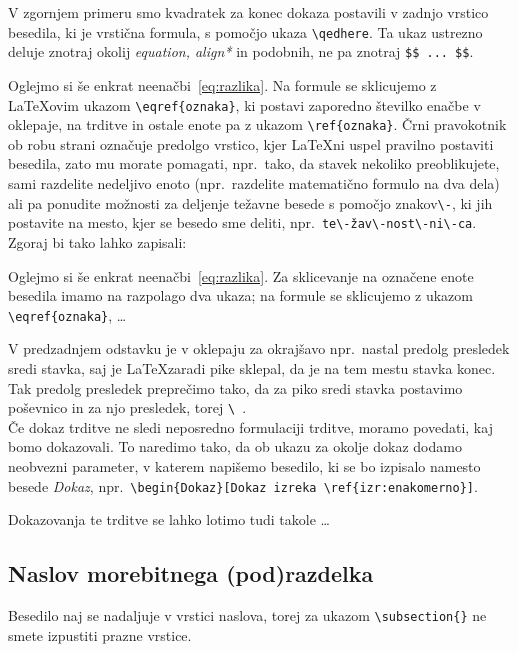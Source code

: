 \documentclass[mat1]{fmfdelo}
\begin{document}
V zgornjem primeru smo kvadratek za konec dokaza postavili v zadnjo vrstico besedila, ki je vrstična formula, s pomočjo ukaza \verb|\qedhere|.  Ta ukaz ustrezno deluje znotraj okolij \emph{equation, align*} in podobnih, ne pa znotraj \verb|$$ ... $$|.

Oglejmo si še enkrat neenačbi~\eqref{eq:razlika}. Na formule se sklicujemo z \LaTeX ovim ukazom \verb|\eqref{oznaka}|, ki postavi zaporedno številko enačbe v oklepaje, na trditve in ostale enote pa z ukazom \verb|\ref{oznaka}|. Črni pravokotnik ob robu strani označuje predolgo vrstico, kjer \LaTeX ni uspel pravilno postaviti besedila, zato mu morate pomagati, npr.\ tako, da stavek nekoliko preoblikujete, sami razdelite nedeljivo enoto (npr.\ razdelite matematično formulo na dva dela) ali pa ponudite možnosti za deljenje težavne besede s pomočjo znakov\verb|\-|, ki jih postavite na mesto, kjer se besedo sme deliti, npr.\  \verb|te\-žav\-nost\-ni\-ca|. Zgoraj bi tako lahko zapisali:

Oglejmo si še enkrat neenačbi~\eqref{eq:razlika}. Za sklicevanje na označene enote besedila imamo na razpolago dva ukaza; na formule se sklicujemo z ukazom \verb|\eqref{oznaka}|, \dots

V predzadnjem odstavku je v oklepaju za okrajšavo npr.\ nastal predolg presledek sredi stavka, saj je \LaTeX zaradi pike sklepal, da je na tem mestu stavka konec. Tak predolg presledek preprečimo tako, da za piko sredi stavka postavimo poševnico in za njo presledek, torej \verb|\ |.\\

Če dokaz trditve ne sledi neposredno formulaciji trditve, moramo povedati, kaj bomo dokazovali. To naredimo tako, da ob ukazu za okolje dokaz dodamo neobvezni parameter,  v katerem napišemo besedilo, ki se bo izpisalo namesto besede \emph{Dokaz}, npr.\ \verb|\begin{Dokaz}[Dokaz izreka \ref{izr:enakomerno}]|.

\begin{dokaz}
Dokazovanja te trditve se lahko lotimo tudi takole \ldots
\end{dokaz}

\subsection{Naslov morebitnega (pod)razdelka} Besedilo naj se nadaljuje v vrstici naslova, torej za ukazom \verb|\subsection{}| ne smete izpustiti prazne vrstice.
\end{document}
